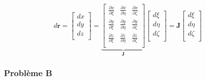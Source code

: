 \documentclass
[
a4paper,                      %
twoside,					  %
12pt,                         %
abstract,		      %
fleqn,                        %
]
{scrartcl} %
\begin{document}
\begin{description}
\begin{equation}
d\mathbf{r}=\begin{bmatrix}
dx\\
dy\\
dz\\
\end{bmatrix}=\underbrace{\begin{bmatrix}
\frac{\partial x}{\partial\xi}&\frac{\partial x}{\partial\eta}&\frac{\partial x}{\partial\zeta}\\
\frac{\partial y}{\partial\xi}&\frac{\partial y}{\partial\eta}&\frac{\partial y}{\partial\zeta}\\
\frac{\partial z}{\partial\xi}&\frac{\partial z}{\partial\eta}&\frac{\partial z}{\partial\zeta}\\
\end{bmatrix}}_{\mathbf{J}}\begin{bmatrix}
d\xi\\
d\eta\\
d\zeta\\
\end{bmatrix}=\mathbf{J}\begin{bmatrix}
d\xi\\
d\eta\\
d\zeta\\
\end{bmatrix}
\end{equation}


\begin{center}
\end{center}


\end{description}

\subsubsection{Probl\`eme B}
\end{document}
